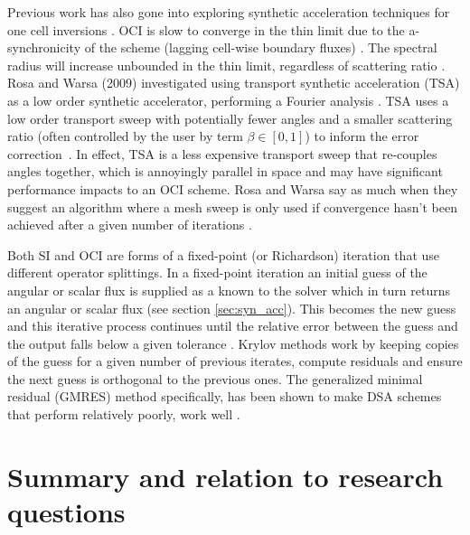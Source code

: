 Previous work has also gone into exploring synthetic acceleration techniques for one cell inversions \cite{ kim_coarse_2000}.
OCI is slow to converge in the thin limit due to the a-synchronicity of the scheme (lagging cell-wise boundary fluxes) \cite{hoagland_hybrid_2021}.
The spectral radius will increase unbounded in the thin limit, regardless of scattering ratio \cite{rosa_cellwise_2013}.
Rosa and Warsa (2009) investigated using transport synthetic acceleration (TSA) as a low order synthetic accelerator, performing a Fourier analysis \cite{tsa2009rosa, tsa_slab2006rosa, tsa_2d2007rosa}.
TSA uses a low order transport sweep with potentially fewer angles and a smaller scattering ratio (often controlled by the user by term $\beta \in [0,1]$) to inform the error correction~\cite{tsa1997gilles}.
In effect, TSA is a less expensive transport sweep that re-couples angles together, which is annoyingly parallel in space and may have significant performance impacts to an OCI scheme.
Rosa and Warsa say as much when they suggest an algorithm where a mesh sweep is only used if convergence hasn't been achieved after a given number of iterations \cite{tsa2009rosa}.

Both SI and OCI are forms of a fixed-point (or Richardson) iteration that use different operator splittings.
In a fixed-point iteration an initial guess of the angular or scalar flux is supplied as a known to the solver which in turn returns an angular or scalar flux (see section \ref{sec:syn_acc}).
This becomes the new guess and this iterative process continues until the relative error between the guess and the output falls below a given tolerance \cite{lewis_computational_1984}.
Krylov methods work by keeping copies of the guess for a given number of previous iterates, compute residuals and ensure the next guess is orthogonal to the previous ones\cite{gmres1996kelley, patton_gmres_2002}.
The generalized minimal residual (GMRES) method specifically, has been shown to make DSA schemes that perform relatively poorly, work well \cite{kylov2004warsa, subspace2004warsa}.


\section{Summary and relation to research questions}

